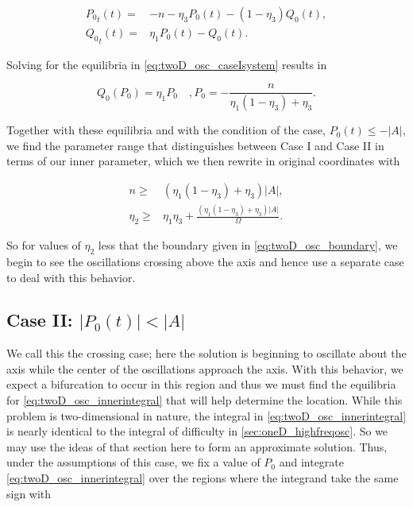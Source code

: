 \begin{equation}\label{eq:twoD_osc_caseIsystem}
\begin{aligned}
{P_0}_t(t) =& -n -\eta_3P_0(t)-(1-\eta_3)Q_0(t),\\
{Q_0}_t(t) =& \eta_1P_0(t)-Q_0(t).
\end{aligned}
\end{equation}

Solving for the equilibria in \eqref{eq:twoD_osc_caseIsystem} results in

\begin{equation*}
Q_0(P_0)=\eta_1P_0\quad,P_0=-\frac{n}{\eta_1(1-\eta_3)+\eta_3}. 
\end{equation*}

Together with these equilibria and with the condition of the case, $P_0(t)\le -|A|$, we find the parameter range that distinguishes between Case I and Case II in terms of our inner parameter, which we then rewrite in original coordinates with

\begin{equation}\label{eq:twoD_osc_boundary}
\begin{aligned}
n\ge& (\eta_1(1-\eta_3)+\eta_3)|A|,\\
\eta_2\ge&\eta_1\eta_3+ \frac{(\eta_1(1-\eta_3)+\eta_3)|A|}{\Omega}.
\end{aligned}
\end{equation}

So for values of $\eta_2$ less that the boundary given in \eqref{eq:twoD_osc_boundary}, we begin to see the oscillations crossing above the axis and hence use a separate case to deal with this behavior.

\subsection{Case II: $|P_0(t)|<|A|$}
\label{subsec:twoD_highfreqosc_caseII}

We call this the crossing case; here the solution is beginning to oscillate about the axis while the center of the oscillations approach the axis. With this behavior, we expect a bifurcation to occur in this region and thus we must find the equilibria for \eqref{eq:twoD_osc_innerintegral} that will help determine the location. While this problem is two-dimensional in nature, the integral in \eqref{eq:twoD_osc_innerintegral} is nearly identical to the integral of difficulty in \autoref{sec:oneD_highfreqosc}. So we may use the ideas of that section here to form an approximate solution. Thus, under the assumptions of this case, we fix a value of $P_0$ and integrate \eqref{eq:twoD_osc_innerintegral} over the regions where the integrand take the same sign with

